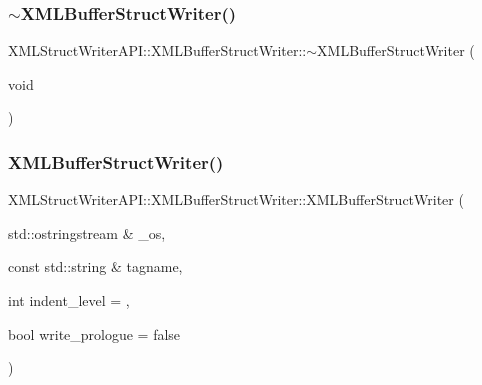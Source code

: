 \subsubsection{\texorpdfstring{$\sim$XMLBufferStructWriter()}{~XMLBufferStructWriter()}\hspace{0.1cm}{\footnotesize\ttfamily [2/3]}}
{\footnotesize\ttfamily X\+M\+L\+Struct\+Writer\+A\+P\+I\+::\+X\+M\+L\+Buffer\+Struct\+Writer\+::$\sim$\+X\+M\+L\+Buffer\+Struct\+Writer (\begin{DoxyParamCaption}\item[{void}]{ }\end{DoxyParamCaption})\hspace{0.3cm}{\ttfamily [inline]}}

\mbox{\label{classXMLStructWriterAPI_1_1XMLBufferStructWriter_adc348003ff0e12b5a820972cbc51a376}} 
\subsubsection{\texorpdfstring{XMLBufferStructWriter()}{XMLBufferStructWriter()}\hspace{0.1cm}{\footnotesize\ttfamily [3/3]}}
{\footnotesize\ttfamily X\+M\+L\+Struct\+Writer\+A\+P\+I\+::\+X\+M\+L\+Buffer\+Struct\+Writer\+::\+X\+M\+L\+Buffer\+Struct\+Writer (\begin{DoxyParamCaption}\item[{std\+::ostringstream \&}]{\+\_\+os,  }\item[{const std\+::string \&}]{tagname,  }\item[{int}]{indent\+\_\+level = {},  }\item[{bool}]{write\+\_\+prologue = {\ttfamily false} }\end{DoxyParamCaption})\hspace{0.3cm}{\ttfamily [inline]}}

